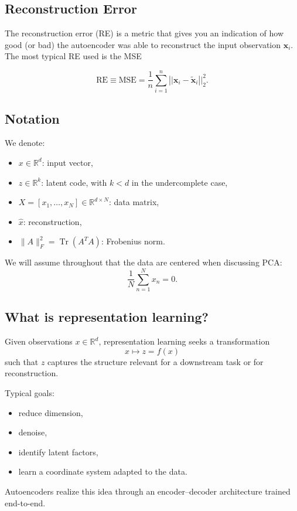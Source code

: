 \documentclass[%
oneside,                 %
final,                   %
10pt]{article}
\begin{document}
\subsection{Reconstruction Error}

The reconstruction error (RE) is a metric that gives you an indication of how good (or bad) the autoencoder was able to reconstruct
the input observation $\mathbf{x}_{i}$. The most typical RE used is the MSE

\[
\textrm{RE}\equiv \textrm{MSE} = \frac{1}{n}\sum_{i = 1}^{n}\left\vert\vert\mathbf{x}_{i}-\tilde{\mathbf{x}}_{i}\right\vert\vert^{2}_2.
\]

\subsection{Notation}
We denote:
\begin{itemize}
\item \(x \in \mathbb{R}^d\): input vector,

\item \(z \in \mathbb{R}^k\): latent code, with \(k<d\) in the undercomplete case,

\item \(X=[x_1,\dots,x_N]\in \mathbb{R}^{d\times N}\): data matrix,

\item \(\hat x\): reconstruction,

\item \(\|A\|_F^2 = \operatorname{Tr}(A^T A)\): Frobenius norm.
\end{itemize}

\noindent
We will assume throughout that the data are centered when discussing PCA:
\[
\frac{1}{N}\sum_{n=1}^N x_n = 0.
\]
\subsection{What is representation learning?}

Given observations \(x\in\mathbb{R}^d\), representation learning seeks a transformation
\[
x \mapsto z = f(x)
\]
such that \(z\) captures the structure relevant for a downstream task or for reconstruction.

\begin{block}{Typical goals: }
\begin{itemize}
\item reduce dimension,

\item denoise,

\item identify latent factors,

\item learn a coordinate system adapted to the data.
\end{itemize}

\noindent
Autoencoders realize this idea through an encoder--decoder architecture trained end-to-end.
\end{block}
\end{document}
